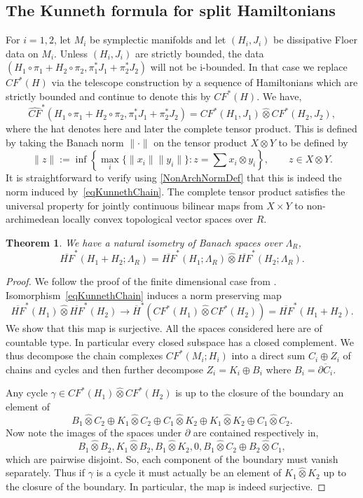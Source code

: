 \documentclass[11pt]{amsart}
\newtheorem{tm}{Theorem}[section]
\theoremstyle{definition}
\theoremstyle{remark}
\begin{document}
\subsection{The Kunneth formula for split Hamiltonians}\label{SubsecKunnethHam}
For $i=1,2$, let $M_i$  be symplectic manifolds and let $(H_i,J_i)$ be dissipative Floer data on $M_i$.  Unless $(H_i,J_i)$ are strictly bounded, the data $(H_1\circ\pi_1+H_2\circ\pi_2,\pi_1^*J_1+\pi_2^*J_2)$ will not be i-bounded. In that case we replace $CF^*(H)$ via the telescope construction by a sequence of Hamiltonians which are strictly bounded and continue to denote this by $CF^*(H)$.  We have,
\begin{equation}\label{eqKunnethChain}
\widehat{CF}^*(H_1\circ\pi_1+H_2\circ\pi_2,\pi_1^*J_1+\pi_2^*J_2)=CF^*(H_1,J_1)\hat\otimes CF^*(H_2,J_2),
\end{equation}
where the hat denotes here and later the complete tensor product. This is defined by taking the Banach norm $\|\cdot\|$ on the tensor product $X\otimes Y$ to be defined  by
\[
\|z\|:=\inf\left\{\max_i\{\|x_i\|\|y_i\|\}:z=\sum x_i\otimes y_i\right\},\qquad z\in X\otimes Y.
\]
It is straightforward to verify using \eqref{NonArchNormDef} that this is indeed the norm induced by~\eqref{eqKunnethChain}. The complete tensor product satisfies the universal property for jointly continuous bilinear maps from $X\times Y$ to non-archimedean locally convex topological vector spaces over $R$.
\begin{tm}\label{tmCohomologyKunneth}
We have a natural isometry of Banach spaces over $\Lambda_R$,
\[
\overline{HF}^*(H_1+H_2;\Lambda_R)=\overline{HF}^*(H_1;\Lambda_R)\hat\otimes \overline{HF}^*(H_2;\Lambda_R).
\]
\end{tm}

\begin{proof}
We follow the proof of the finite dimensional case from \cite{griffiths2014principles}. Isomorphism~\eqref{eqKunnethChain} induces a norm preserving map
\[
\overline{HF}^*(H_1)\hat{\otimes}\overline{HF}^*(H_2)\to \overline{H}^*(CF^*(H_1) \hat{\otimes}CF^*(H_2))=\overline{HF}^*(H_1+ H_2).
\]
We show that this map is  surjective. All the spaces considered here are of countable type. In particular every closed subspace has a closed complement. We thus decompose the chain complexes $CF^*(M_i;H_i)$ into a direct sum $C_i\oplus Z_i$ of chains and cycles and then further decompose $Z_i=K_i\oplus B_i$ where $B_i=\overline{\partial C_i}$.

Any cycle $\gamma\in CF^*(H_1)\hat{\otimes}CF^*(H_2)$ is up to the closure of the boundary an element of
\[
B_1\hat{\otimes} C_2\oplus K_1\hat{\otimes} C_2\oplus C_1\hat{\otimes} K_2\oplus K_1\hat{\otimes} K_2\oplus C_1\hat{\otimes} C_2.
\]
Now note the images of the spaces under $\partial$ are contained respectively in,
\[
B_1\hat{\otimes} B_2,K_1\hat{\otimes} B_2, B_1\hat{\otimes} K_2,0,B_1\hat{\otimes} C_2\oplus B_2\hat{\otimes} C_1,
\]
which are pairwise disjoint. So, each component of the boundary must vanish separately. Thus if $\gamma$ is a cycle it must actually be an element of $K_1\hat{\otimes} K_2$ up to the closure of the boundary. In particular, the map is indeed surjective.

\end{proof}
\end{document}
